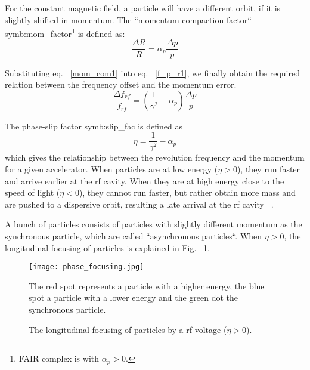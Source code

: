 For the constant magnetic field, a particle will have a different orbit, if it is slightly shifted in momentum. The ``momentum compaction factor`` \gls{symb:mom_factor}\footnote{FAIR complex is with $\alpha_p>0$.} is defined as:
\begin{equation}
\frac{\Delta R}{R}=\alpha_p\frac{\Delta p}{p}\label{mom_com1}
\end{equation} 


Substituting eq. ~\ref{mom_com1} into eq. ~\ref{f_p_r1}, we finally obtain the required relation between the frequency offset and the momentum error.
\begin{equation}
\frac{\Delta f_{\mathit{rf}}}{f_{\mathit{rf}}} = (\frac{1}{\gamma^2}-\alpha_{\mathit{p}})\frac{\Delta{p}}{p}
\label{eq:phaseP1}
\end{equation}

The phase-slip factor \gls{symb:slip_fac} is defined as
\begin{equation}
\label{eq:phse_slip}
\eta =\frac{1}{\gamma^2}-\alpha_{\mathit{p}}
\end{equation}
which gives the relationship between the revolution frequency and the momentum for a given accelerator. When particles are at low energy ($\eta > 0$), they run faster and arrive earlier at the rf cavity. When they are at high energy close to the speed of light ($\eta < 0$), they cannot run faster, but rather obtain more mass and are pushed to a dispersive orbit, resulting a late arrival at the rf cavity ~\cite{lee_accelerator_2011}. 

A bunch of particles consists of particles with slightly different momentum as the synchronous particle, which are called ``asynchronous particles``. When $\eta > 0$, the longitudinal focusing of particles is explained in Fig. ~\ref{phase_focusing}. 
\begin{figure}[!htb]
   \centering   
   \texttt{[image: phase\_focusing.jpg]}
   \caption{The longitudinal focusing of particles by a rf voltage ($\eta > 0$).}{The red spot represents a particle with a higher energy, the blue spot a particle with a lower energy and the green dot the synchronous particle.}
   \label{phase_focusing}
\end{figure}

